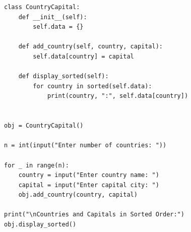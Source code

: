 \begin{verbatim}
class CountryCapital:
    def __init__(self):
        self.data = {}

    def add_country(self, country, capital):
        self.data[country] = capital

    def display_sorted(self):
        for country in sorted(self.data):
            print(country, ":", self.data[country])


obj = CountryCapital()

n = int(input("Enter number of countries: "))

for _ in range(n):
    country = input("Enter country name: ")
    capital = input("Enter capital city: ")
    obj.add_country(country, capital)

print("\nCountries and Capitals in Sorted Order:")
obj.display_sorted()
\end{verbatim}
